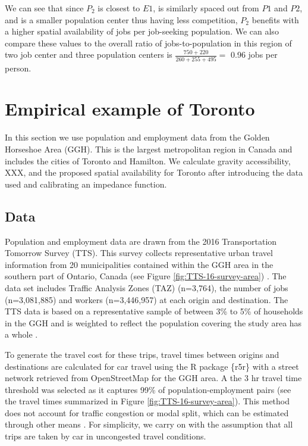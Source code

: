 \documentclass[]{elsarticle} %
\begin{document}
We can see that since \(P_2\) is closest to \(E1\), is similarly spaced
out from \(P1\) and \(P2\), and is a smaller population center thus
having less competition, \(P_2\) benefits with a higher spatial
availability of jobs per job-seeking population. We can also compare
these values to the overall ratio of jobs-to-population in this region
of two job center and three population centers is
\(\frac{750+220}{260+255+495}=\) 0.96 jobs per person.

\hypertarget{empirical-example-of-toronto}{%
\section{Empirical example of
Toronto}\label{empirical-example-of-toronto}}

In this section we use population and employment data from the Golden
Horseshoe Area (GGH). This is the largest metropolitan region in Canada
and includes the cities of Toronto and Hamilton. We calculate gravity
accessibility, XXX, and the proposed spatial availability for Toronto
after introducing the data used and calibrating an impedance function.

\hypertarget{data}{%
\subsection{Data}\label{data}}

Population and employment data are drawn from the 2016 Transportation
Tomorrow Survey (TTS). This survey collects representative urban travel
information from 20 municipalities contained within the GGH area in the
southern part of Ontario, Canada (see Figure
\ref{fig:TTS-16-survey-area}) \citep{data_management_group_tts_2018}.
The data set includes Traffic Analysis Zones (TAZ) (n=3,764), the number
of jobs (n=3,081,885) and workers (n=3,446,957) at each origin and
destination. The TTS data is based on a representative sample of between
3\% to 5\% of households in the GGH and is weighted to reflect the
population covering the study area has a whole
\citep{data_management_group_tts_2018}.

To generate the travel cost for these trips, travel times between
origins and destinations are calculated for car travel using the R
package \{r5r\} \citep{r5r_2021} with a street network retrieved from
OpenStreetMap for the GGH area. A the 3 hr travel time threshold was
selected as it captures 99\% of population-employment pairs (see the
travel times summarized in Figure \ref{fig:TTS-16-survey-area}). This
method does not account for traffic congestion or modal split, which can
be estimated through other means
\citep[e.g.,][]{allen_suburbanization_2021, higgins2021changes}. For
simplicity, we carry on with the assumption that all trips are taken by
car in uncongested travel conditions.
\end{document}
